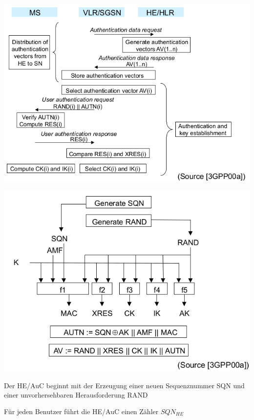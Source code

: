 \documentclass[a4paper]{article}
\begin{document}
\begin{multicols}{3}
      \begin{itemize*}
            \item \includegraphics[width=\linewidth]{Assets/NetworkSecurity-umts-authentication-mechanism.png}
            \item \includegraphics[width=\linewidth]{Assets/NetworkSecurity-umts-authentication-vectors.png}
            \begin{itemize*}
                  \item Der HE/AuC beginnt mit der Erzeugung einer neuen Sequenznummer SQN und einer unvorhersehbaren Herausforderung RAND
                  \begin{itemize*} 
                        \item Für jeden Benutzer führt die HE/AuC einen Zähler $SQN_{HE}$ 

\end{itemize*}
\end{itemize*}
\end{itemize*}
\end{multicols}
\end{document}
